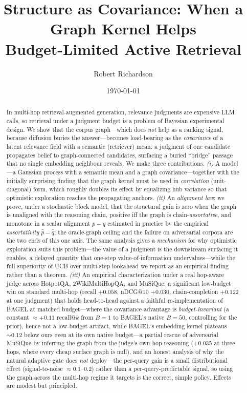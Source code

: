 \documentclass[11pt]{article}
\title{\textbf{Structure as Covariance: When a Graph Kernel Helps\\ Budget-Limited Active Retrieval}}
\author{Robert Richardson}
\date{\today}
\theoremstyle{plain}\newtheorem{theorem}{Theorem}\newtheorem{lemma}{Lemma}\newtheorem{proposition}{Proposition}
\theoremstyle{definition}\newtheorem{assumption}{Assumption}\newtheorem{remark}{Remark}
\begin{document}
\maketitle

\begin{abstract}
In multi-hop retrieval-augmented generation, relevance judgments are expensive LLM calls, so retrieval under a
judgment budget is a problem of Bayesian experimental design. We show that the corpus graph---which does
\emph{not} help as a ranking signal, because diffusion buries the answer---becomes load-bearing as the
\emph{covariance} of a latent relevance field with a semantic (retriever) mean: a judgment of one candidate
propagates belief to graph-connected candidates, surfacing a buried ``bridge'' passage that no single embedding
neighbour reveals. We make three contributions. \emph{(i)} A model---a Gaussian process with a semantic mean and a
graph covariance---together with the initially surprising finding that the graph kernel must be used in
\emph{correlation} (unit-diagonal) form, which roughly doubles its effect by equalizing hub variance so that
optimistic exploration reaches the propagating anchors. \emph{(ii)} An \emph{alignment law}: we prove, under a
stochastic block model, that the structural gain is zero when the graph is unaligned with the reasoning chain,
positive iff the graph is chain-\emph{assortative}, and monotone in a scalar alignment $p-q$ estimated in practice
by the empirical \emph{assortativity} $\hat p-\hat q$; the oracle-graph ceiling and the failure on adversarial
corpora are the two ends of this one axis. The same analysis gives a \emph{mechanism} for why optimistic
exploration suits this problem---the value of a judgment is the downstream surfacing it enables, a delayed quantity
that one-step value-of-information undervalues---while the full superiority of UCB over multi-step lookahead we
report as an empirical finding rather than a theorem. \emph{(iii)} An empirical characterization under a real
hop-aware judge across HotpotQA, 2WikiMultiHopQA, and MuSiQue: a significant low-budget win on standard multi-hop
(recall $+0.058$, nDCG@10 $+0.030$, chain-completion $+0.122$ at one judgment) that holds head-to-head against a
faithful re-implementation of BAGEL at matched budget---where the covariance advantage is \emph{budget-invariant}
(a constant $\approx+0.11$ recall@$k$ from $B{=}1$ to BAGEL's native $B{=}50$, controlling for the prior), hence not
a low-budget artifact, while BAGEL's embedding kernel plateaus $\sim0.12$ below ours even at its own native
budget---a partial rescue of
adversarial MuSiQue by
inferring the graph from the judge's own hop-reasoning ($+0.035$ at three hops, where every cheap surface graph is
null), and an honest analysis of why the natural
adaptive gate does \emph{not} deploy---the per-query gain is a small distributional effect (signal-to-noise
$\approx 0.1$--$0.2$) rather than a per-query-predictable signal, so using the graph across the multi-hop regime
it targets is the correct, simple policy. Effects are modest but principled.
\end{abstract}
\end{document}
